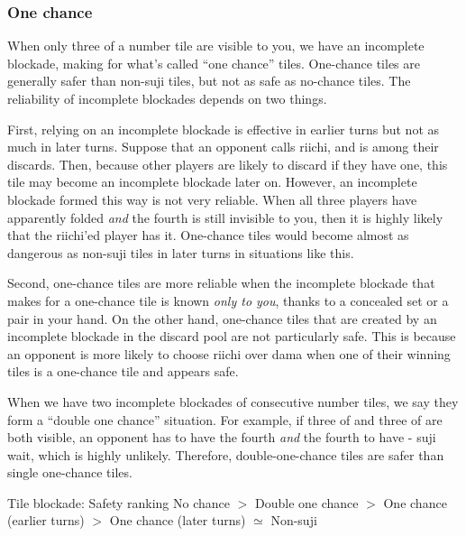 {{\subsubsection*{One chance}

When only three of a number tile are visible to you, we have an incomplete blockade, making for what's called ``one chance'' tiles. One-chance tiles are generally safer than non-{\jap suji} tiles, but not as safe as no-chance tiles. 
The reliability of incomplete blockades depends on two things. 

\bigskip
First, relying on an incomplete blockade is effective in earlier turns but not as much in later turns. Suppose that an opponent calls riichi, and {\LARGE{}} is among their discards. Then, because other players are likely to discard {\LARGE{}} if they have one, this tile may become an incomplete blockade later on. However, an incomplete blockade formed this way is not very reliable. When all three players have apparently folded \emph{and} the fourth {\LARGE{}} is still invisible to you, then it is highly likely that the riichi'ed player has it. One-chance tiles would become almost as dangerous as non-{\jap suji} tiles in later turns in situations like this. 

\bigskip
Second, one-chance tiles are more reliable when the incomplete blockade that makes for a one-chance tile is known \emph{only to you}, thanks to a concealed set or a pair in your hand. On the other hand, one-chance tiles that are created by an incomplete blockade in the discard pool are not particularly safe. This is because an opponent is more likely to choose riichi over {\jap dama} when one of their winning tiles is a one-chance tile and appears safe.

\bigskip

When we have two incomplete blockades of consecutive number tiles, we say they form a ``double one chance'' situation. For example, if three of {\LARGE{}} and three of {\LARGE{}} are both visible, an opponent has to have the fourth {\LARGE{}} \emph{and} the fourth {\LARGE{}} to have {\LARGE{}-} {\jap suji} wait, which is highly unlikely. Therefore, double-one-chance tiles are safer than single one-chance tiles.

\bigskip
\begin{itembox}[c]{Tile blockade: Safety ranking}
No chance $>$ Double one chance $>$ One chance (earlier turns) $>$ One chance (later turns) $\simeq$ Non-{\jap suji}
\vsps
\end{itembox}
\bigskip

}}
